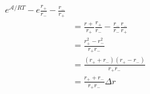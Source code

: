 \begin{eqnarray}\label{eqn:net-likelihood}
e^{\mathcal A/RT} - e\frac{r_+}{r_-} - \frac{r_-}{r_+} \\
& =  \frac{r+}{r_+}\frac{r_+}{r_-} - \frac{r_-}{r_-}\frac{r_-}{r_+} \\
& =  \frac{r_+^2 - r_-^2}{r_+r_-} \\
& =  \frac{(r_+ + r_-)(r_+ - r_-)}{r_+r_-} \\
& =  \frac{r_+ + r_-}{r_+r_-}\Delta r \\
\end{eqnarray}
